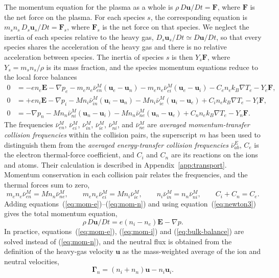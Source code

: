 The momentum equation for the plasma as a whole is \(\rho\,D\mathbf{u}/Dt=\mathbf{F}\), where \(\mathbf{F}\) is the net force on the plasma. For each species \(s\), the corresponding equation is \(m_sn_s\,D_s\mathbf{u}_s/Dt=\mathbf{F}_s\), where \(\mathbf{F}_s\) is the net force on that species. We neglect the inertia of each species relative to the heavy gas, \(D_s\mathbf{u}_s/Dt\simeq D\mathbf{u}/Dt\), so that every species shares the acceleration of the heavy gas and there is no relative acceleration between species. The inertia of species \(s\) is then \(Y_s\mathbf{F}\), where \(Y_s=m_sn_s/\rho\) is its mass fraction, and the species momentum equations reduce to the local force balances \cite{zhdanov2002transport}
\begin{align}
0 &= -en_e\mathbf{E}-\nabla p_e
 - m_en_e\bar\nu^M_{en}(\mathbf{u}_e-\mathbf{u}_n)
 - m_en_e\bar\nu^M_{ei}(\mathbf{u}_e-\mathbf{u}_i)
 - C_en_ek_B\nabla T_e
 - Y_e\mathbf{F},
\label{eq:mom-e}\\
0 &= +en_i\mathbf{E}-\nabla p_i
 - Mn_i\bar\nu^M_{in}(\mathbf{u}_i-\mathbf{u}_n)
 - Mn_i\bar\nu^M_{ie}(\mathbf{u}_i-\mathbf{u}_e)
 + C_in_ek_B\nabla T_e
 - Y_i\mathbf{F},
\label{eq:mom-i}\\
0 &= -\nabla p_n
 - Mn_n\bar\nu^M_{ni}(\mathbf{u}_n-\mathbf{u}_i)
 - Mn_n\bar\nu^M_{ne}(\mathbf{u}_n-\mathbf{u}_e)
 + C_nn_ek_B\nabla T_e
 - Y_n\mathbf{F} .
\label{eq:mom-n}
\end{align}
The frequencies \(\bar\nu^M_{en}\), \(\bar\nu^M_{ei}\), \(\bar\nu^M_{in}\), \(\bar\nu^M_{ie}\), \(\bar\nu^M_{ni}\), and \(\bar\nu^M_{ne}\) are \emph{averaged momentum-transfer collision frequencies} within the collision pairs, the superscript \(m\) has been used to distinguish them from the \emph{averaged energy-transfer collision frequencies} \(\bar\nu^E_{ab}\), \(C_e\) is the electron thermal-force coefficient, and \(C_i\) and \(C_n\) are its reactions on the ions and atoms. Their calculation is described in Appendix~\ref{app:transport}. Momentum conservation in each collision pair relates the frequencies, and the thermal forces sum to zero,
\begin{equation}
m_en_e\bar\nu^M_{en}=Mn_n\bar\nu^M_{ne},\qquad
m_en_e\bar\nu^M_{ei}=Mn_i\bar\nu^M_{ie},\qquad
n_i\bar\nu^M_{in}=n_n\bar\nu^M_{ni},\qquad
C_i+C_n=C_e .
\label{eq:newton3}
\end{equation}
Adding equations~(\ref{eq:mom-e})--(\ref{eq:mom-n}) and using equation~(\ref{eq:newton3}) gives the total momentum equation,
\begin{equation}
\rho\,D\mathbf{u}/Dt = e(n_i-n_e)\mathbf{E}-\nabla p .
\label{eq:bulk-balance}
\end{equation}
In practice, equations~(\ref{eq:mom-e}), (\ref{eq:mom-i}) and (\ref{eq:bulk-balance}) are solved instead of (\ref{eq:mom-n}), and the neutral flux is obtained from the definition of the heavy-gas velocity \(\mathbf{u}\) as the mass-weighted average of the ion and neutral velocities,
\begin{equation}
\boldsymbol{\Gamma}_n= (n_i+n_n)\mathbf{u}-n_i\mathbf{u}_i.
\label{eq:flux-n}
\end{equation}

